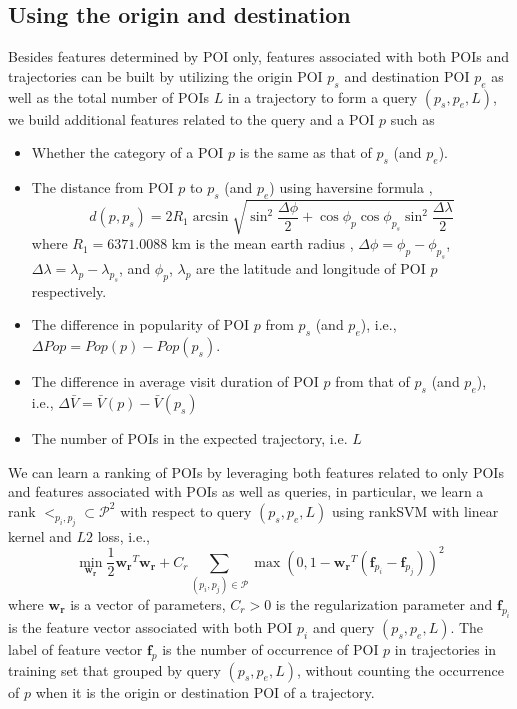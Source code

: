 \subsection{Using the origin and destination}
\label{ranksvm}
%
Besides features determined by POI only, features associated with both POIs and trajectories
can be built by utilizing the origin POI $p_s$ and destination POI $p_e$ as well as 
the total number of POIs $L$ in a trajectory to form a query $(p_s, p_e, L)$,
we build additional features related to the query and a POI $p$ such as
\begin{itemize}
\item Whether the category of a POI $p$ is the same as that of $p_s$ (and $p_e$).
\item The distance from POI $p$ to $p_s$ (and $p_e$) using haversine formula \cite{haversine},
      \begin{displaymath}
          d(p, p_s) = 2 R_1 \arcsin \sqrt{ \sin^2 \frac{\Delta \phi}{2} +
                      \cos \phi_p \cos \phi_{p_s} \sin^2 \frac{\Delta \lambda}{2} }
      \end{displaymath}
      where $R_1 = 6371.0088$ km is the mean earth radius \cite{earth_radius},
      $\Delta \phi = \phi_p - \phi_{p_s}$, $\Delta \lambda = \lambda_p - \lambda_{p_s}$,
      and $\phi_p$, $\lambda_p$ are the latitude and longitude of POI $p$ respectively.
\item The difference in popularity of POI $p$ from $p_s$ (and $p_e$),
      i.e., $\Delta Pop = Pop(p) - Pop(p_s)$.
\item The difference in average visit duration of POI $p$ from that of $p_s$ (and $p_e$),
      i.e., $\Delta \bar{V} = \bar{V}(p) - \bar{V}(p_s)$
\item The number of POIs in the expected trajectory, i.e. $L$
\end{itemize}

We can learn a ranking of POIs by leveraging both features related to only POIs and features 
associated with POIs as well as queries, in particular, 
we learn a rank $<_{p_i, p_j} \subset \mathcal{P}^2$ with respect to query $(p_s, p_e, L)$ 
using rankSVM with linear kernel and $L2$ loss\cite{lranksvm}, 
i.e.,
\begin{displaymath}
\min_{\mathbf{w_r}} \frac{1}{2} \mathbf{w_r}^T \mathbf{w_r} +
                    C_r \sum_{(p_i, p_j) \in \mathcal{P}} 
                    \max \left( 0, 1 - \mathbf{w_r}^T (\mathbf{f}_{p_i} - \mathbf{f}_{p_j}) \right)^2
\end{displaymath}
where $\mathbf{w_r}$ is a vector of parameters,
$C_r > 0$ is the regularization parameter and
$\mathbf{f}_{p_i}$ is the feature vector associated with both POI $p_i$ and query $(p_s, p_e, L)$.
The label of feature vector $\mathbf{f}_p$ is the number of occurrence of POI $p$ in trajectories 
in training set that grouped by query $(p_s, p_e, L)$, 
without counting the occurrence of $p$ when it is the origin or destination POI of a trajectory.

